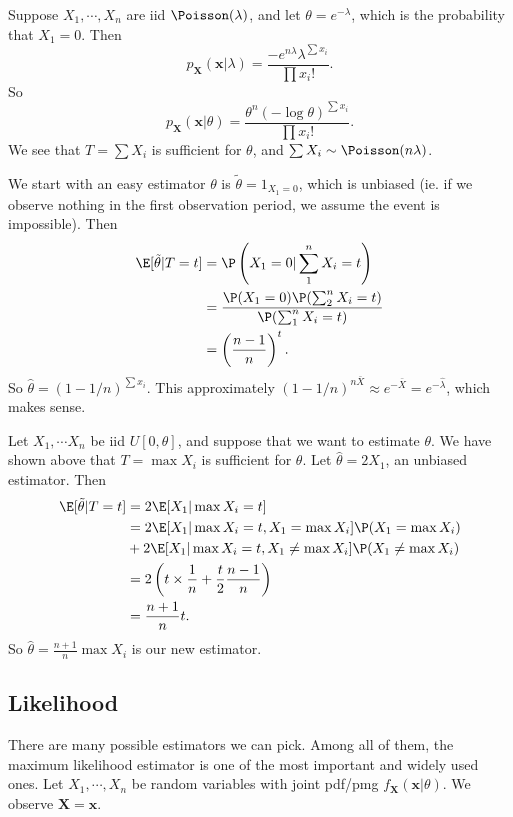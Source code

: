 \documentclass[a4paper]{article}
\begin{document}
\begin{eg}
  Suppose $X_1, \cdots, X_n$ are iid $\Poisson(\lambda)$, and let $\theta = e^{-\lambda}$, which is the probability that $X_1 = 0$. Then
  \[
    p_\mathbf{X}(\mathbf{x}|\lambda) =\frac{-e^{n\lambda}\lambda^{\sum x_i}}{\prod x_i!}.
  \]
  So
  \[
    p_\mathbf{X}(\mathbf{x}|\theta) = \frac{\theta^n(-\log \theta)^{\sum x_i}}{\prod x_i!}.
  \]
  We see that $T = \sum X_i$ is sufficient for $\theta$, and $\sum X_i \sim \Poisson (n\lambda)$.

  We start with an easy estimator $\theta$ is $\tilde{\theta} = 1_{X_1 = 0}$, which is unbiased (ie. if we observe nothing in the first observation period, we assume the event is impossible). Then
  \begin{align*}
    \E[\tilde{\theta}| T = t] &= \P\left(X_1 = 0|\sum_1^n X_i = t\right)\\
    &= \frac{\P(X_1 = 0)\P(\sum_2^n X_i = t)}{\P(\sum_1^n X_i = t)}\\
    &= \left(\frac{n - 1}{n}\right)^t.
  \end{align*}
  So $\hat{\theta} = (1 - 1/n)^{\sum x_i}$. This approximately $(1 - 1/n)^{n\bar{X}} \approx e^{-\bar X} = e^{-\hat{\lambda}}$, which makes sense.
\end{eg}

\begin{eg}
  Let $X_1, \cdots X_n$ be iid $U[0, \theta]$, and suppose that we want to estimate $\theta$. We have shown above that $T = \max X_i$ is sufficient for $\theta$. Let $\hat{\theta} = 2X_1$, an unbiased estimator. Then
  \begin{align*}
    \E[\tilde{\theta}|T = t] &= 2\E[X_1|\max X_i = t]\\
    &= 2\E[X_1|\max X_i = t, X_1 = \max X_i]\P(X_1 = \max X_i)\\
    &+ 2\E[X_1|\max X_i = t, X_1 \not= \max X_i] \P(X_1 \not= \max X_i)\\
    &= 2\left(t\times \frac{1}{n} + \frac{t}{2}\frac{n - 1}{n}\right)\\
    &= \frac{n + 1}{n}t.
  \end{align*}
  So $\hat{\theta} = \frac{n + 1}{n}\max X_i$ is our new estimator.
\end{eg}

\subsection{Likelihood}
There are many possible estimators we can pick. Among all of them, the maximum likelihood estimator is one of the most important and widely used ones. Let $X_1, \cdots , X_n$ be random variables with joint pdf/pmg $f_\mathbf{X}(\mathbf{x}|\theta)$. We observe $\mathbf{X} = \mathbf{x}$.
\end{document}
